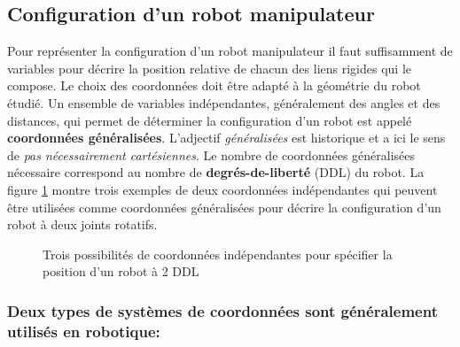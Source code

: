 \subsection{Configuration d'un robot manipulateur}
Pour représenter la configuration d'un robot manipulateur il faut suffisamment de variables pour décrire la position relative de chacun des liens rigides qui le compose. Le choix des coordonnées doit être adapté à la géométrie du robot étudié. Un ensemble de variables indépendantes, généralement des angles et des distances, qui permet de déterminer la configuration d'un robot est appelé \textbf{coordonnées généralisées}. L'adjectif \textit{généralisées} est historique et a ici le sens de \textit{pas nécessairement cartésiennes}. Le nombre de coordonnées généralisées nécessaire correspond au nombre de \textbf{degrés-de-liberté} (DDL) du robot.
La figure \ref{fig:coor} montre trois exemples de deux coordonnées indépendantes qui peuvent être utilisées comme coordonnées généralisées pour décrire la configuration d'un robot à deux joints rotatifs.

\begin{figure}[htbp]
        \centering
				\vspace{10pt}
				\vspace{10pt}
				\vspace{-10pt}
        \caption{Trois possibilités de coordonnées indépendantes pour spécifier la position d'un robot à 2 DDL}
				\label{fig:coor}
\end{figure}


\subsubsection{Deux types de systèmes de coordonnées sont généralement utilisés en robotique:}

